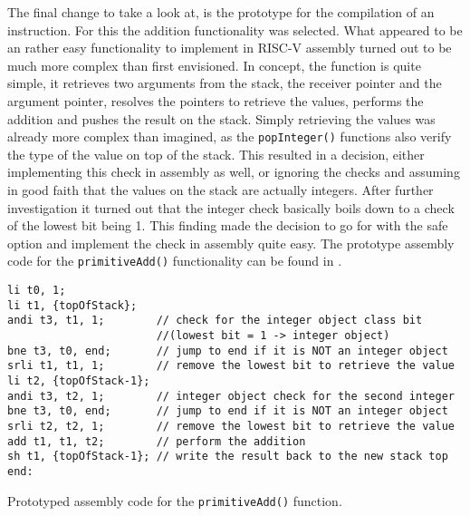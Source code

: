 The final change to take a look at, is the prototype for the compilation of an instruction. For this the addition functionality was selected. What appeared to be an rather easy functionality to implement in RISC-V assembly turned out to be much more complex than first envisioned. 
In concept, the function is quite simple, it retrieves two arguments from the stack, the receiver pointer and the argument pointer, resolves the pointers to retrieve the values, performs the addition and pushes the result on the stack. 
Simply retrieving the values was already more complex than imagined, as the \texttt{popInteger()} functions also verify the type of the value on top of the stack. This resulted in a decision, either implementing this check in assembly as well, or ignoring the checks and assuming in good faith that the values on the stack are actually integers. After further investigation it turned out that the integer check basically boils down to a check of the lowest bit being 1. This finding made the decision to go for with the safe option and implement the check in assembly quite easy. 
The prototype assembly code for the \texttt{primitiveAdd()} functionality can be found in .
\begin{listing}[h]
\begin{verbatim}
li t0, 1;
li t1, {topOfStack};
andi t3, t1, 1;        // check for the integer object class bit 
                       //(lowest bit = 1 -> integer object)
bne t3, t0, end;       // jump to end if it is NOT an integer object
srli t1, t1, 1;        // remove the lowest bit to retrieve the value
li t2, {topOfStack-1};
andi t3, t2, 1;        // integer object check for the second integer
bne t3, t0, end;       // jump to end if it is NOT an integer object
srli t2, t2, 1;        // remove the lowest bit to retrieve the value
add t1, t1, t2;        // perform the addition
sh t1, {topOfStack-1}; // write the result back to the new stack top
end: 
\end{verbatim}
\caption{Prototyped assembly code for the \texttt{primitiveAdd()} function.}
\label{lst:primitiveAddAsm}
\end{listing}

